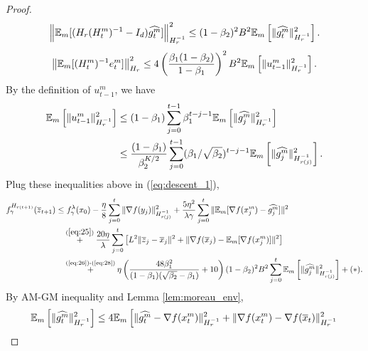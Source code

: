 \documentclass{article} %
\numberwithin{equation}{section}
\renewcommand{\eqref}[1]{(\ref{#1})}
\begin{document}
\begin{proof}
\begin{equation}
        \left\|\mathbb{E}_m [(H_r(H_t^m)^{-1}-I_d)\widehat{g_t^m}]\right\|_{H_r^{-1}}^2 \leq (1-\beta_2)^2B^2\mathbb{E}_m\left[\|\widehat{g_t^m}\|_{H_r^{-1}}^2\right].
    \end{equation}
    \begin{equation}\label{eq:27}
        \left\| \mathbb{E}_m[(H_t^m)^{-1}e_t^m] \right\|_{H_r}^2 \leq 4\left(\frac{\beta_1(1-\beta_2)}{1-\beta_1}\right)^2B^2\mathbb{E}_m\left[\|u_{t-1}^m\|_{H_r^{-1}}^2\right].
    \end{equation}
    By the definition of $u_{t-1}^m$, we have
    \begin{equation}\label{eq:28}
        \begin{aligned}
            \mathbb{E}_m\left[\|u_{t-1}^m\|_{H_r^{-1}}^2\right] 
            &\leq (1-\beta_1)\sum_{j=0}^{t-1}\beta_1^{t-j-1} \mathbb{E}_m\left[\|\widehat{g_{j}^m}\|_{H_r^{-1}}^2\right] \\
            &\leq \frac{(1-\beta_1)}{\beta_2^{K/2}}\sum_{j=0}^{t-1}(\beta_1/\sqrt{\beta_2})^{t-j-1} \mathbb{E}_m\left[\|\widehat{g_{j}^m}\|_{H_{r(j)}^{-1}}^2\right].
        \end{aligned}
    \end{equation}
    Plug these inequalities above in \eqref{eq:descent_1},
    \begin{equation}\label{eq:descent_2}
        \begin{aligned}
            f_\gamma^{H_{r(t+1)}}(\overline{z}_{t+1}) 
            &\leq f_{\gamma}^{\lambda}(x_0) - \frac{\eta}{8} \sum_{j=0}^t\|\nabla f(y_j)\|_{H_{r(j)}^{-1}}^2 + \frac{5\eta^2}{\lambda\gamma} \sum_{j=0}^t\|\expect_m[\nabla f(x_j^m)-\widehat{g_j^m}]\|^2 \\
            &\quad \overset{\eqref{eq:25}}{+} \frac{20\eta}{\lambda} \sum_{j=0}^t\left[L^2\|\overline{z}_j-\overline{x}_j\|^2 + \|\nabla f(\overline{x}_j)-\expect_m[\nabla f(x_j^m)]\|^2\right] \\
            &\quad \overset{\text{\eqref{eq:26}-\eqref{eq:28}}}{+} \eta\left(\frac{48\beta_1^2}{(1-\beta_1)(\sqrt{\beta_2}-\beta_1)}+10\right)(1-\beta_2)^2B^2 \sum_{j=0}^t\expect_m\left[\|\widehat{g_j^m}\|_{H_{r(j)}^{-1}}^2\right] + (*).
        \end{aligned}
    \end{equation}
    By AM-GM inequality and Lemma \ref{lem:moreau_env},
    \begin{equation}
        \begin{aligned}
            \expect_m\left[\|\widehat{g_t^m}\|_{H_r^{-1}}^2\right] 
            &\leq 4\expect_m\left[\|\widehat{g_t^m}-\nabla f(x_t^m)\|_{H_r^{-1}}^2 + \|\nabla f(x_t^m)-\nabla f(\overline{x}_t)\|_{H_r^{-1}}^2\right. \\

\end{aligned}
\end{equation}
\end{proof}
\end{document}
